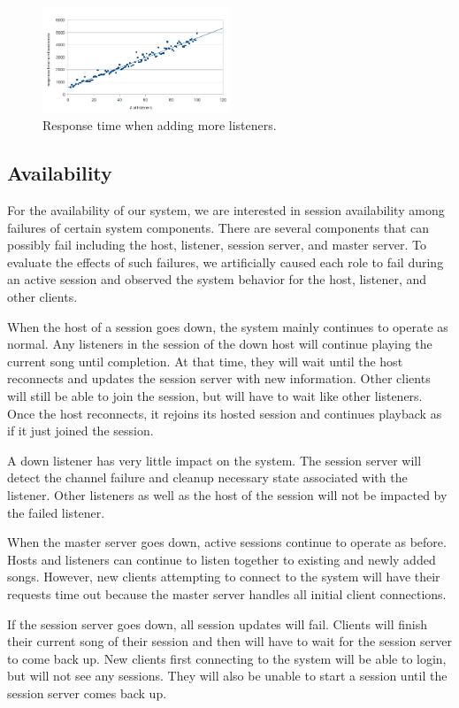 \begin{figure}[h]
	\centering
	\includegraphics[width=0.5\textwidth]{add_listeners_response_time.png}
	\caption{Response time when adding more listeners.}
	\label{fig:addListenersResponseTime}
\end{figure}

\subsection{Availability}

For the availability of our system, we are interested in session
availability among failures of certain system components. There are
several components that can possibly fail including the host,
listener, session server, and master server. To evaluate the
effects of such failures, we artificially caused each role to fail
during an active session and observed the system behavior for the
host, listener, and other clients.

When the host of a session goes down, the system mainly continues
to operate as normal. Any listeners in the session of the down host
will continue playing the current song until completion. At that
time, they will wait until the host reconnects and updates the
session server with new information. Other clients will still be
able to join the session, but will have to wait like other
listeners. Once the host reconnects, it rejoins its hosted session
and continues playback as if it just joined the session.

A down listener has very little impact on the system. The session
server will detect the channel failure and cleanup necessary state
associated with the listener. Other listeners as well as the host
of the session will not be impacted by the failed listener.

When the master server goes down, active sessions continue to
operate as before. Hosts and listeners can continue to listen
together to existing and newly added songs. However, new clients
attempting to connect to the system will have their requests time
out because the master server handles all initial client connections.

If the session server goes down, all session updates will fail.
Clients will finish their current song of their session and then
will have to wait for the session server to come back up. New clients
first connecting to the system will be able to login, but will not
see any sessions. They will also be unable to start a session until
the session server comes back up.